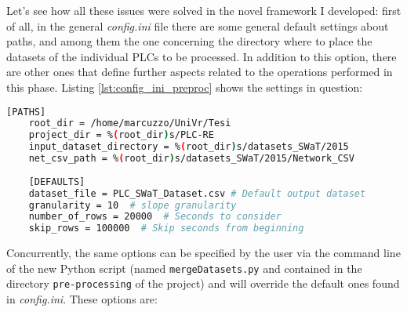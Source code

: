 \bigskip
Let's see how all these issues were solved in the novel framework I developed: first of all, in the general \textit{config.ini} file there are some general default settings about paths, and among them the one concerning the directory where to place the datasets of the individual PLCs to be processed. In addition to this option, there are other ones that define further aspects related to the operations performed in this phase. Listing \ref{lst:config_ini_preproc} shows the settings in question: 

\begin{lstlisting}[language=bash, numbers=none, caption=Paths and parameters for the Pre-processing phase in \textit{config.ini} file, label=lst:config_ini_preproc]	
	[PATHS]
	root_dir = /home/marcuzzo/UniVr/Tesi
	project_dir = %(root_dir)s/PLC-RE
	input_dataset_directory = %(root_dir)s/datasets_SWaT/2015
	net_csv_path = %(root_dir)s/datasets_SWaT/2015/Network_CSV
	
	[DEFAULTS]
	dataset_file = PLC_SWaT_Dataset.csv # Default output dataset
	granularity = 10  # slope granularity
	number_of_rows = 20000  # Seconds to consider
	skip_rows = 100000  # Skip seconds from beginning
\end{lstlisting}

Concurrently, the same options can be specified by the user via the command line of the new Python script (named \texttt{mergeDatasets.py} and contained in the directory \texttt{pre-processing} of the project) and will override the default ones found in \textit{config.ini}. These options are:


